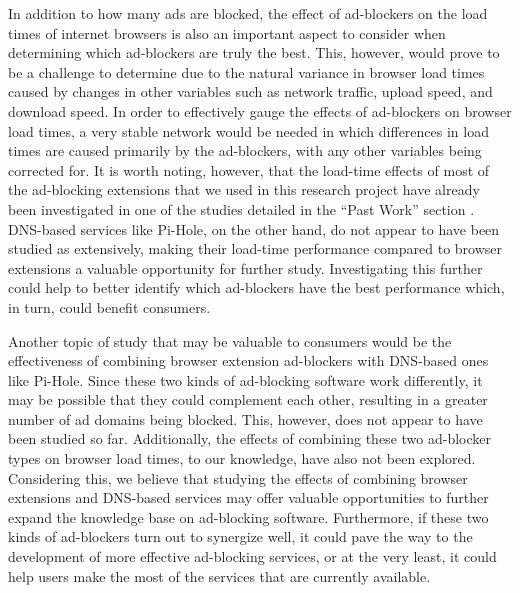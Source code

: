 \documentclass[sigsmall]{acmart}
\begin{document}
In addition to how many ads are blocked, the effect of ad-blockers on the load times of internet browsers is also an important aspect to consider when determining which ad-blockers are truly the best. This, however, would prove to be a challenge to determine due to the natural variance in browser load times caused by changes in other variables such as network traffic, upload speed, and download speed. In order to effectively gauge the effects of ad-blockers on browser load times, a very stable network would be needed in which differences in load times are caused primarily by the ad-blockers, with any other variables being corrected for. It is worth noting, however, that the load-time effects of most of the ad-blocking extensions that we used in this research project have already been investigated in one of the studies detailed in the “Past Work” section \cite{10.1145/3091478.3091514}. DNS-based services like Pi-Hole, on the other hand, do not appear to have been studied as extensively, making their load-time performance compared to browser extensions a valuable opportunity for further study. Investigating this further could help to better identify which ad-blockers have the best performance which, in turn, could benefit consumers.

Another topic of study that may be valuable to consumers would be the effectiveness of combining browser extension ad-blockers with DNS-based ones like Pi-Hole. Since these two kinds of ad-blocking software work differently, it may be possible that they could complement each other, resulting in a greater number of ad domains being blocked. This, however, does not appear to have been studied so far. Additionally, the effects of combining these two ad-blocker types on browser load times, to our knowledge, have also not been explored. Considering this, we believe that studying the effects of combining browser extensions and DNS-based services may offer valuable opportunities to further expand the knowledge base on ad-blocking software. Furthermore, if these two kinds of ad-blockers turn out to synergize well, it could pave the way to the development of more effective ad-blocking services, or at the very least, it could help users make the most of the services that are currently available.
\end{document}
